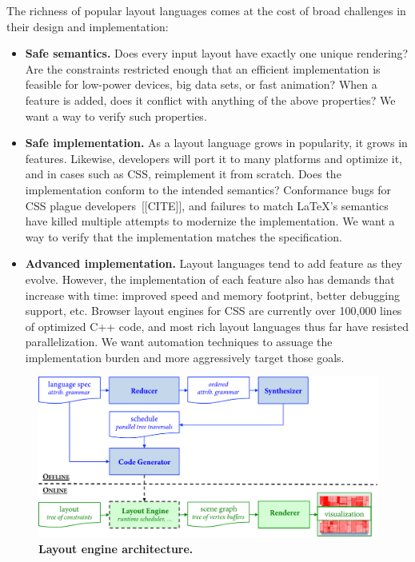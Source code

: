 The richness of popular layout languages comes at the cost of broad challenges in their design and implementation:

\begin{itemize}
\item \textbf{Safe semantics.} Does every input layout have exactly one unique rendering? Are the constraints restricted enough that an efficient implementation is feasible for low-power devices, big data sets, or fast animation? When a feature is added, does it conflict with anything of the above properties? We want a way to verify such properties.
\item \textbf{Safe implementation.} As a layout language grows in popularity, it grows in features. Likewise, developers will port it to many platforms and optimize it, and in cases such as CSS, reimplement it from scratch. Does the implementation conform to the intended semantics? Conformance bugs for CSS plague developers~[[CITE]], and failures to match {\LaTeX}'s semantics have killed multiple attempts to modernize the implementation. We want a way to verify that the implementation matches the specification.
\item \textbf{Advanced implementation.} Layout languages tend to add feature as they evolve. However, the implementation of each feature also has demands that increase with time: improved speed and memory footprint, better debugging support, etc. Browser layout engines for CSS are currently over 100,000 lines of optimized C++ code, and most rich layout languages thus far have resisted parallelization. We want automation techniques to assuage the implementation burden and more aggressively target those goals.
\end{itemize}


\begin{figure}
\centering
\includegraphics[trim=0 0 0 0,clip,width=1.0\columnwidth]{chapter2/architecture}
\caption{\textbf{Layout engine architecture.} }
\label{fig:architecture}
\end{figure}

